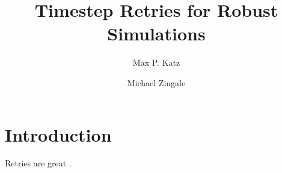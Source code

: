 \documentclass[times,modern]{elsarticle}
\begin{document}
\title{Timestep Retries for Robust Simulations}

\author{Max P. Katz}
\author{Michael Zingale}

\maketitle

\begin{abstract}
\end{abstract}

\section{Introduction}\label{Sec:Introduction}

Retries are great \cite{katzzingale:2019}.




\end{document}
